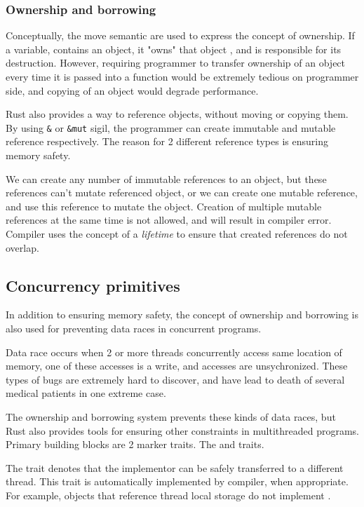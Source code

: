 \subsubsection{Ownership and borrowing}
Conceptually, the move semantic are used to express the concept of ownership. If a variable, contains an object, it "owns"
that object , and is responsible for its destruction. However, requiring programmer to transfer ownership of an object every time
it is passed into a function would be extremely tedious on programmer side, and copying of an object would degrade performance.

Rust also provides a way to reference objects, without moving or copying them. By using \verb|&| or
\verb|&mut| sigil, the programmer can create immutable and mutable reference respectively. The reason for 2 different
reference types is ensuring memory safety.

We can create any number of immutable references to an object, but these references can't mutate referenced object, or
we can create one mutable reference, and use this reference to mutate the object. Creation of multiple mutable references
at the same time is not allowed, and will result in compiler error. Compiler uses the concept of a \textit{lifetime} to ensure that created
references do not overlap.

\subsection{Concurrency primitives}
In addition to ensuring memory safety, the concept of ownership and borrowing is also used for preventing data
races in concurrent programs.

Data race occurs when 2 or more threads concurrently access same location of memory, one of these accesses is a write,
and accesses are unsychronized. These types of bugs are extremely hard to discover, and have lead to death of several medical patients in
one extreme case\cite{article:therac}.

The ownership and borrowing system prevents these kinds of data races, but Rust also provides tools for ensuring other
constraints in multithreaded programs. Primary building blocks are 2 marker traits. The  and  traits.

The  trait denotes that the implementor can be safely transferred to a different thread. This trait is automatically
implemented by compiler, when appropriate. For example, objects that reference thread local storage do not implement .

